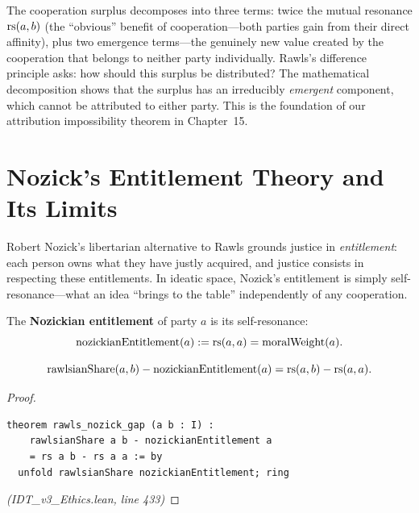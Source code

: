 \begin{interpretation}
The cooperation surplus decomposes into three terms: twice the mutual resonance
$\mathrm{rs}(a,b)$ (the ``obvious'' benefit of cooperation---both parties gain from
their direct affinity), plus two emergence terms---the genuinely new value
created by the cooperation that belongs to neither party individually. Rawls's
difference principle asks: how should this surplus be distributed? The
mathematical decomposition shows that the surplus has an irreducibly
\emph{emergent} component, which cannot be attributed to either party. This
is the foundation of our attribution impossibility theorem in Chapter~15.
\end{interpretation}

\section{Nozick's Entitlement Theory and Its Limits}
\label{sec:nozick}

Robert Nozick's libertarian alternative to Rawls grounds justice in
\emph{entitlement}: each person owns what they have justly acquired, and
justice consists in respecting these entitlements. In ideatic space,
Nozick's entitlement is simply self-resonance---what an idea ``brings to
the table'' independently of any cooperation.

\begin{definition}
\label{def:nozick-entitlement}
The \textbf{Nozickian entitlement} of party $a$ is its self-resonance:
\[
  \mathrm{nozickianEntitlement}(a) := \mathrm{rs}(a, a) = \mathrm{moralWeight}(a).
\]
\end{definition}

\begin{theorem}
\label{thm:rawls-nozick}
\[
  \mathrm{rawlsianShare}(a, b) - \mathrm{nozickianEntitlement}(a)
  = \mathrm{rs}(a, b) - \mathrm{rs}(a, a).
\]
\end{theorem}

\begin{proof}
\begin{lstlisting}
theorem rawls_nozick_gap (a b : I) :
    rawlsianShare a b - nozickianEntitlement a
    = rs a b - rs a a := by
  unfold rawlsianShare nozickianEntitlement; ring
\end{lstlisting}
\textit{(IDT\_v3\_Ethics.lean, line 433)}
\end{proof}

